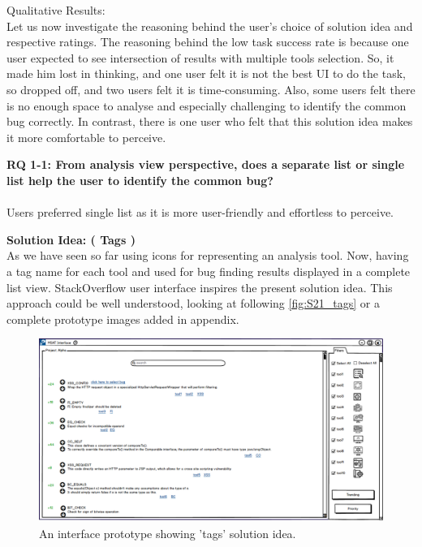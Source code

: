 Qualitative Results: \\

Let us now investigate the reasoning behind the user’s choice of solution idea and respective ratings. The reasoning behind the low task success rate is because one user expected to see intersection of results with multiple tools selection. So, it made him lost in thinking, and one user felt it is not the best UI to do the task, so dropped off, and two users felt it is time-consuming. Also, some users felt there is no enough space to analyse and especially challenging to identify the common bug correctly. In contrast, there is one user who felt that this solution idea makes it more comfortable to perceive. \\

\begin{myboxi}{{\textbf{RQ 1-1: From analysis view perspective, does a separate list or single list help the user to identify the common bug?}}}
\\ \\	Users preferred single list as it is more user-friendly and effortless to perceive.
\end{myboxi}	
	
\textbf{Solution Idea: ( Tags )} \\

As we have seen so far using icons for representing an analysis tool. Now, having a tag name for each tool and used for bug finding results displayed in a complete list view. StackOverflow user interface inspires the present solution idea. This approach could be well understood, looking at following \autoref{fig:S21_tags} or a complete prototype images added in appendix.  \\



\begin{figure}[hbt!]
	\centering
	\includegraphics[width=\linewidth]{figures/solution_ideas_snaps/S21_tags}
	\caption{An interface prototype showing 'tags' solution idea.}
	\label{fig:S21_tags}
\end{figure}


